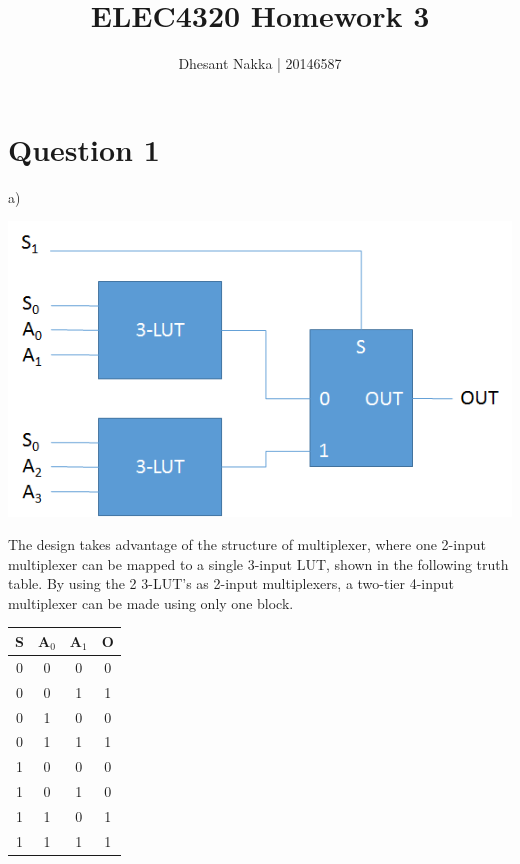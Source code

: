 \documentclass[11pt]{article}
\title{ELEC4320 Homework 3}
\author{Dhesant Nakka | 20146587}
\newcommand{\textunderscript}[1]{$_{\text{#1}}$}
\begin{document}
\maketitle

\section*{Question 1}
a)
\begin{center}
  \includegraphics[width=0.7\linewidth]{q1_mux.png}
\end{center}
The design takes advantage of the structure of multiplexer, where one 2-input multiplexer can be mapped to a single 3-input LUT, shown in the following truth table. By using the 2 3-LUT's as 2-input multiplexers, a two-tier 4-input multiplexer can be made using only one block.
\begin{center}
\begin{tabular}{ | c c c | c | }
  \hline
  S & A\textunderscript{0} & A\textunderscript{1} & O \\
  \hline
  0 & 0 & 0 & 0 \\
  0 & 0 & 1 & 1 \\
  0 & 1 & 0 & 0 \\
  0 & 1 & 1 & 1 \\
  1 & 0 & 0 & 0 \\
  1 & 0 & 1 & 0 \\
  1 & 1 & 0 & 1 \\
  1 & 1 & 1 & 1 \\
  \hline
\end{tabular}\\
\end{center}
\end{document}
